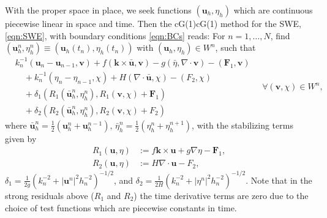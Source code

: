 With the proper space in place, we seek functions $(\mathbf{u}_h, \eta_h)$ which
are continuous piecewise linear in space and time. Then the cG(1)cG(1) method
for the SWE, \eqref{eqn:SWE}, with boundary conditions \eqref{eqn:BCs} reads:
For $n = 1, \dots, N$, find $(\mathbf{u}_h^n, \eta_h^n) \equiv
(\mathbf{u}_h(t_n), \eta_h(t_n))$ with $(\mathbf{u}_h, \eta_h) \in W^n$, such
that
\begin{equation}
  \begin{split}
    &k_n^{-1}(\mathbf{u}_n - \mathbf{u}_{n-1}, \mathbf{v}) + f(\mathbf{k} \times
        \bar{\mathbf{u}}, \mathbf{v}) - g (\bar{\eta}, \nabla\cdot \mathbf{v}) -
        (\mathbf{F}_1,\mathbf{v}) \\
    &\quad+ k_n^{-1}(\eta_n - \eta_{n-1}, \chi) + H (\nabla\cdot
      \bar{\mathbf{u}},\chi) - (F_2,\chi)\\
    &\quad+ \delta_1 ( R_1(\bar{\mathbf{u}}_h^n, \eta_h^n),
      R_1(\mathbf{v}, \chi) + \mathbf{F}_1) \\
    &\quad+ \delta_2 (R_2(\bar{\mathbf{u}}_h^n, \eta_h^n),
        R_2(\mathbf{v}, \chi) + F_2)
  \end{split}
  \quad \forall (\mathbf{v},\chi) \in W^n,
  \label{eqn:cG1cG1}
\end{equation}
where $\bar{\mathbf{u}}_h^n = \frac{1}{2}(\mathbf{u}_h^n + \mathbf{u}_h^{n-1}),\,
\bar{\eta}_h^n = \frac{1}{2}(\eta_h^n + \eta_h^{n+1})$, with the stabilizing
terms given by
\begin{align*}
  R_1(\mathbf{u},\eta) &:= f\mathbf{k} \times \mathbf{u} + g \nabla \eta -
    \mathbf{F}_1, \\
  R_2(\mathbf{u},\eta) &:= H \nabla\cdot \mathbf{u} - F_2,
\end{align*}
$\delta_1 = \frac{1}{2g}(k_n^{-2} + |\mathbf{u}^n|^2 h_n^{-2})^{-1/2}$, and
$\delta_2 = \frac{1}{2H}(k_n^{-2} + |\eta^n|^2 h_n^{-2})^{-1/2}$. Note that in
the strong residuals above ($R_1$ and $R_2$) the time derivative terms are zero
due to the choice of test functions which are piecewise constants in time.
